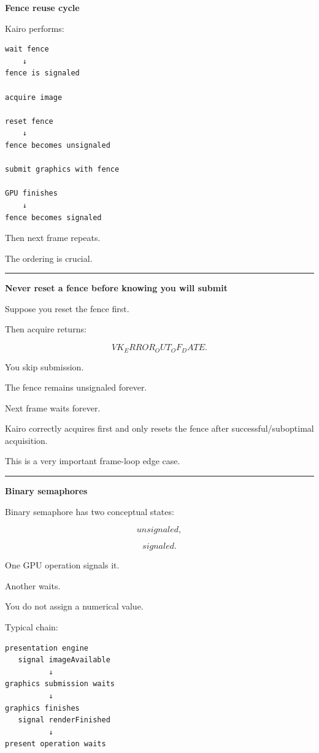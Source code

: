 \textbf{Fence reuse cycle}

Kairo performs:

\begin{verbatim}
wait fence
    ↓
fence is signaled

acquire image

reset fence
    ↓
fence becomes unsignaled

submit graphics with fence

GPU finishes
    ↓
fence becomes signaled
\end{verbatim}

Then next frame repeats.

The ordering is crucial.

\begin{center}\rule{0.5\linewidth}{0.5pt}\end{center}

\textbf{Never reset a fence before knowing you will submit}

Suppose you reset the fence first.

Then acquire returns:

\[
VK_ERROR_OUT_OF_DATE.
\]

You skip submission.

The fence remains unsignaled forever.

Next frame waits forever.

Kairo correctly acquires first and only resets the fence after successful/suboptimal acquisition.

This is a very important frame-loop edge case.

\begin{center}\rule{0.5\linewidth}{0.5pt}\end{center}

\textbf{Binary semaphores}

Binary semaphore has two conceptual states:

\[
unsignaled,
\]

\[
signaled.
\]

One GPU operation signals it.

Another waits.

You do not assign a numerical value.

Typical chain:

\begin{verbatim}
presentation engine
   signal imageAvailable
          ↓
graphics submission waits
          ↓
graphics finishes
   signal renderFinished
          ↓
present operation waits
\end{verbatim}

